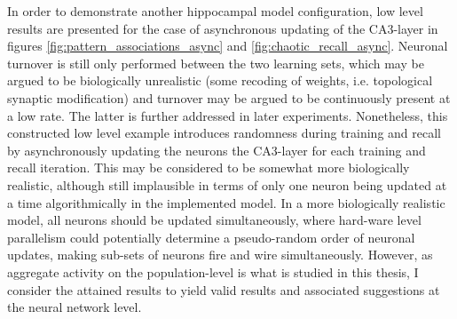 In order to demonstrate another hippocampal model configuration, low level results are presented for the case of asynchronous updating of the CA3-layer in figures \ref{fig:pattern_associations_async} and \ref{fig:chaotic_recall_async}. Neuronal turnover is still only performed between the two learning sets, which may be argued to be biologically unrealistic (some recoding of weights, i.e. topological synaptic modification) and turnover may be argued to be continuously present at a low rate. The latter is further addressed in later experiments.
Nonetheless, this constructed low level example introduces randomness during training and recall by asynchronously updating the neurons the CA3-layer for each training and recall iteration. This may be considered to be somewhat more biologically realistic, although still implausible in terms of only one neuron being updated at a time algorithmically in the implemented model. In a more biologically realistic model, all neurons should be updated simultaneously, where hard-ware level parallelism could potentially determine a pseudo-random order of neuronal updates, making sub-sets of neurons fire and wire simultaneously. 
However, as aggregate activity on the population-level is what is studied in this thesis, I consider the attained results to yield valid results and associated suggestions at the neural network level.

